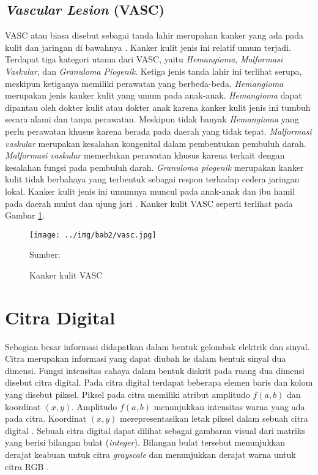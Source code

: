     \subsection{\textit{Vascular Lesion} (VASC)}
    VASC atau biasa disebut sebagai tanda lahir merupakan kanker yang ada pada kulit dan jaringan di bawahnya \citep{Balas2018}. Kanker kulit jenis ini relatif umum terjadi. Terdapat tiga kategori utama dari VASC, yaitu \textit{Hemangioma}, \textit{Malformasi Vaskular}, dan \textit{Granuloma Piogenik}. Ketiga jenis tanda lahir ini terlihat serupa, meskipun ketiganya memiliki perawatan yang berbeda-beda. \textit{Hemangioma} merupakan jenis kanker kulit yang umum pada anak-anak. \textit{Hemangioma} dapat dipantau oleh dokter kulit atau dokter anak karena kanker kulit jenis ini tumbuh secara alami dan tanpa perawatan. Meskipun tidak banyak \textit{Hemangioma} yang perlu perawatan khusus karena berada pada daerah yang tidak tepat. \textit{Malformasi vaskular} merupakan kesalahan kongenital dalam pembentukan pembuluh darah. \textit{Malformasi vaskular} memerlukan perawatan khusus karena terkait dengan kesalahan fungsi pada pembuluh darah. \textit{Granuloma piogenik} merupakan kanker kulit tidak berbahaya yang terbentuk sebagai respon terhadap cedera jaringan lokal. Kanker kulit jenis ini umumnya muncul pada anak-anak dan ibu hamil pada daerah mulut dan ujung jari \citep{Rastogi2020}. Kanker kulit VASC seperti terlihat pada Gambar \ref{fig:vasc}.
    \begin{figure}[H] 
        \begin{center} 
            \texttt{[image: ../img/bab2/vasc.jpg]}
            \caption{Kanker kulit VASC} 
            \label{fig:vasc}
            Sumber: \citep{Codella2018,Combalia2019,Tschandl2018}
        \end{center} 
    \end{figure}

\section{Citra Digital}
Sebagian besar informasi didapatkan dalam bentuk gelombak elektrik dan sinyal. Citra merupakan informasi yang dapat diubah ke dalam bentuk sinyal dua dimensi. Fungsi intensitas cahaya dalam bentuk diskrit pada ruang dua dimensi disebut citra digital. Pada citra digital terdapat beberapa elemen baris dan kolom yang disebut piksel. Piksel pada citra memiliki atribut amplitudo $f(a,b)$ dan koordinat $(x,y)$. Amplitudo $f(a,b)$ menunjukkan intensitas warna yang ada pada citra. Koordinat $(x,y)$ merepresentasikan letak piksel dalam sebuah citra digital \citep{Ratna2020}. Sebuah citra digital dapat dilihat sebagai gambaran visual dari matriks yang berisi bilangan bulat (\textit{integer}). Bilangan bulat tersebut menunjukkan derajat keabuan untuk citra \textit{grayscale} dan menunjukkan derajat warna untuk citra RGB \citep{Blackledge2005,Septiaji2018}.

